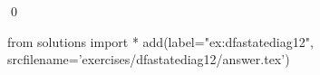 
\begin{ex} 
  \label{ex:dfastatediag12}
  
  \qed
\end{ex} 
\begin{python0}
from solutions import *
add(label="ex:dfastatediag12",
    srcfilename='exercises/dfastatediag12/answer.tex') 
\end{python0}
